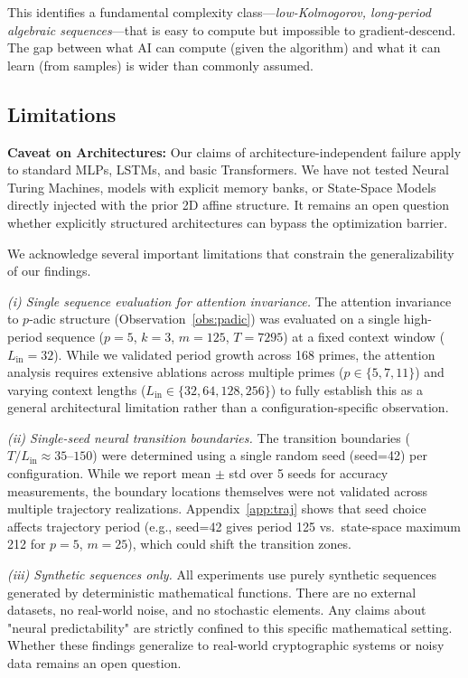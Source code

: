 \documentclass[11pt]{article}
\theoremstyle{plain}
\theoremstyle{definition}
\begin{document}
This identifies a fundamental complexity class---\emph{low-Kolmogorov, long-period algebraic sequences}---that is easy to compute but impossible to gradient-descend. The gap between what AI can compute (given the algorithm) and what it can learn (from samples) is wider than commonly assumed.

\subsection{Limitations}

\textbf{Caveat on Architectures:} Our claims of architecture-independent failure apply to standard MLPs, LSTMs, and basic Transformers. We have not tested Neural Turing Machines, models with explicit memory banks, or State-Space Models directly injected with the prior 2D affine structure. It remains an open question whether explicitly structured architectures can bypass the optimization barrier.


We acknowledge several important limitations that constrain the generalizability of our findings.

\textit{(i) Single sequence evaluation for attention invariance.} The attention invariance to $p$-adic structure (Observation~\ref{obs:padic}) was evaluated on a single high-period sequence ($p=5$, $k=3$, $m=125$, $T=7295$) at a fixed context window ($L_{\mathrm{in}}=32$). While we validated period growth across 168 primes, the attention analysis requires extensive ablations across multiple primes ($p \in \{5, 7, 11\}$) and varying context lengths ($L_{\mathrm{in}} \in \{32, 64, 128, 256\}$) to fully establish this as a general architectural limitation rather than a configuration-specific observation.

\textit{(ii) Single-seed neural transition boundaries.} The transition boundaries ($T/L_{\mathrm{in}} \approx 35$--$150$) were determined using a single random seed (seed=42) per configuration. While we report mean $\pm$ std over 5 seeds for accuracy measurements, the boundary locations themselves were not validated across multiple trajectory realizations. Appendix~\ref{app:traj} shows that seed choice affects trajectory period (e.g., seed=42 gives period 125 vs.\ state-space maximum 212 for $p=5$, $m=25$), which could shift the transition zones.

\textit{(iii) Synthetic sequences only.} All experiments use purely synthetic sequences generated by deterministic mathematical functions. There are no external datasets, no real-world noise, and no stochastic elements. Any claims about "neural predictability" are strictly confined to this specific mathematical setting. Whether these findings generalize to real-world cryptographic systems or noisy data remains an open question.
\end{document}
